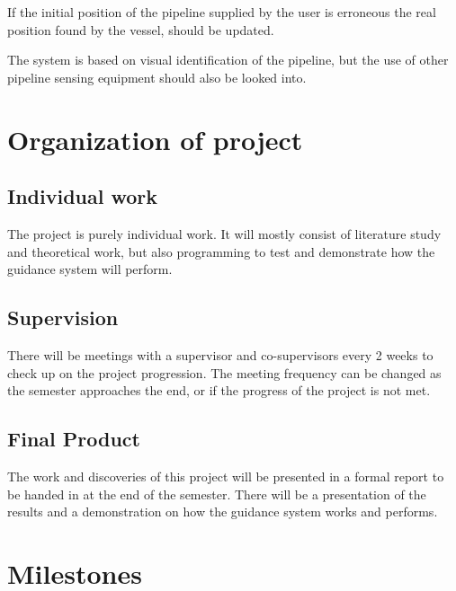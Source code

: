 \documentclass[a4paper,10pt]{article}
\begin{document}
	If the initial position of the pipeline supplied by the user is erroneous the real position found by the vessel,  should be updated.
	
	The system is based on visual identification of the pipeline, but the use of other pipeline sensing equipment should also be looked into. 
	
\section{Organization of project}
	\subsection{Individual work}
	The project is purely individual work. It will mostly consist of literature study and theoretical work, but also programming to test and demonstrate how the guidance system will perform.
	
	\subsection{Supervision}
	There will be meetings with a supervisor and co-supervisors every 2 weeks to check up on the project progression. The meeting frequency can be changed as the semester approaches the end, or if the progress of the project is not met.
	
	\subsection{Final Product}
	The work and discoveries of this project will be presented in a formal report to be handed in at the end of the semester. There will be a presentation of the results and a demonstration on how the guidance system works and performs.

\section{Milestones}
\end{document}
